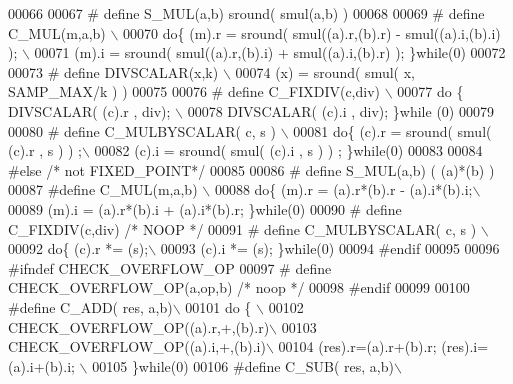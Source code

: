 \begin{DoxyCode}
00066 
00067 \textcolor{preprocessor}{#   define S\_MUL(a,b) sround( smul(a,b) )}
00068 
00069 \textcolor{preprocessor}{#   define C\_MUL(m,a,b) \(\backslash\)}
00070 \textcolor{preprocessor}{      do\{ (m).r = sround( smul((a).r,(b).r) - smul((a).i,(b).i) ); \(\backslash\)}
00071 \textcolor{preprocessor}{          (m).i = sround( smul((a).r,(b).i) + smul((a).i,(b).r) ); \}while(0)}
00072 
00073 \textcolor{preprocessor}{#   define DIVSCALAR(x,k) \(\backslash\)}
00074 \textcolor{preprocessor}{    (x) = sround( smul(  x, SAMP\_MAX/k ) )}
00075 
00076 \textcolor{preprocessor}{#   define C\_FIXDIV(c,div) \(\backslash\)}
00077 \textcolor{preprocessor}{    do \{    DIVSCALAR( (c).r , div);  \(\backslash\)}
00078 \textcolor{preprocessor}{        DIVSCALAR( (c).i  , div); \}while (0)}
00079 
00080 \textcolor{preprocessor}{#   define C\_MULBYSCALAR( c, s ) \(\backslash\)}
00081 \textcolor{preprocessor}{    do\{ (c).r =  sround( smul( (c).r , s ) ) ;\(\backslash\)}
00082 \textcolor{preprocessor}{        (c).i =  sround( smul( (c).i , s ) ) ; \}while(0)}
00083 
00084 \textcolor{preprocessor}{#else  }\textcolor{comment}{/* not FIXED\_POINT*/}\textcolor{preprocessor}{}
00085 
00086 \textcolor{preprocessor}{#   define S\_MUL(a,b) ( (a)*(b) )}
00087 \textcolor{preprocessor}{#define C\_MUL(m,a,b) \(\backslash\)}
00088 \textcolor{preprocessor}{    do\{ (m).r = (a).r*(b).r - (a).i*(b).i;\(\backslash\)}
00089 \textcolor{preprocessor}{        (m).i = (a).r*(b).i + (a).i*(b).r; \}while(0)}
00090 \textcolor{preprocessor}{#   define C\_FIXDIV(c,div) }\textcolor{comment}{/* NOOP */}\textcolor{preprocessor}{}
00091 \textcolor{preprocessor}{#   define C\_MULBYSCALAR( c, s ) \(\backslash\)}
00092 \textcolor{preprocessor}{    do\{ (c).r *= (s);\(\backslash\)}
00093 \textcolor{preprocessor}{        (c).i *= (s); \}while(0)}
00094 \textcolor{preprocessor}{#endif}
00095 
00096 \textcolor{preprocessor}{#ifndef CHECK\_OVERFLOW\_OP}
00097 \textcolor{preprocessor}{#  define CHECK\_OVERFLOW\_OP(a,op,b) }\textcolor{comment}{/* noop */}\textcolor{preprocessor}{}
00098 \textcolor{preprocessor}{#endif}
00099 
00100 \textcolor{preprocessor}{#define  C\_ADD( res, a,b)\(\backslash\)}
00101 \textcolor{preprocessor}{    do \{ \(\backslash\)}
00102 \textcolor{preprocessor}{        CHECK\_OVERFLOW\_OP((a).r,+,(b).r)\(\backslash\)}
00103 \textcolor{preprocessor}{        CHECK\_OVERFLOW\_OP((a).i,+,(b).i)\(\backslash\)}
00104 \textcolor{preprocessor}{        (res).r=(a).r+(b).r;  (res).i=(a).i+(b).i; \(\backslash\)}
00105 \textcolor{preprocessor}{    \}while(0)}
00106 \textcolor{preprocessor}{#define  C\_SUB( res, a,b)\(\backslash\)}

\end{DoxyCode}
